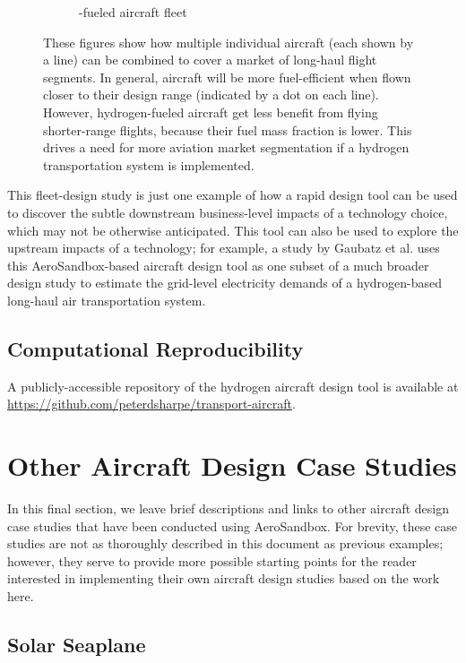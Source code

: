 \begin{figure}[H]
\begin{subfigure}[b]{0.49\textwidth}
        \caption{\textbf{\lh}-fueled aircraft fleet}
        \label{fig:design_space_kerosene}
    \end{subfigure}
    \caption{These figures show how multiple individual aircraft (each shown by a line) can be combined to cover a market of long-haul flight segments. In general, aircraft will be more fuel-efficient when flown closer to their design range (indicated by a dot on each line). However, hydrogen-fueled aircraft get less benefit from flying shorter-range flights, because their fuel mass fraction is lower. This drives a need for more aviation market segmentation if a hydrogen transportation system is implemented.}
    \label{fig:market_segmentation}
\end{figure}

This fleet-design study is just one example of how a rapid design tool can be used to discover the subtle downstream business-level impacts of a technology choice, which may not be otherwise anticipated. This tool can also be used to explore the upstream impacts of a technology; for example, a study by Gaubatz et al. \cite{gaubatz_estimating_2023} uses this AeroSandbox-based aircraft design tool as one subset of a much broader design study to estimate the grid-level electricity demands of a hydrogen-based long-haul air transportation system.

\subsection{Computational Reproducibility}

A publicly-accessible repository of the hydrogen aircraft design tool is available at \url{https://github.com/peterdsharpe/transport-aircraft}.


\section{Other Aircraft Design Case Studies}

In this final section, we leave brief descriptions and links to other aircraft design case studies that have been conducted using AeroSandbox. For brevity, these case studies are not as thoroughly described in this document as previous examples; however, they serve to provide more possible starting points for the reader interested in implementing their own aircraft design studies based on the work here.

\subsection{Solar Seaplane}
\label{sec:solar-seaplane}

